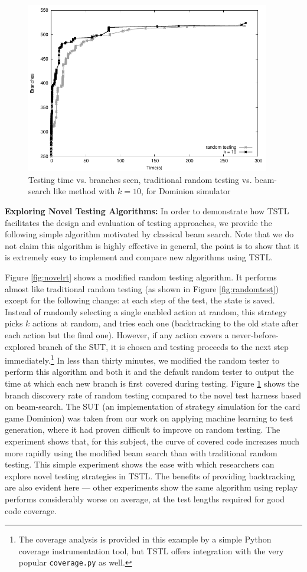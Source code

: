 \documentclass[runningheads,a4paper]{llncs}
\begin{document}
\begin{figure}
\includegraphics[width=4.2in]{explore}
\caption{Testing time vs. branches seen, traditional random testing vs. beam-search like method with $k=10$, for Dominion simulator}
\label{fig:explore}
\end{figure}

{\bf Exploring Novel Testing Algorithms:} In order to demonstrate how
TSTL facilitates the design and evaluation of testing approaches, we
provide the following simple algorithm motivated by classical beam
search.  Note that we do not claim this algorithm is highly effective
in general, the point is to show that it is extremely easy to
implement and compare new algorithms using TSTL.

Figure \ref{fig:novelrt} shows a modified random testing algorithm.
It performs almost like traditional random testing (as shown in Figure
\ref{fig:randomtest}) except for the following change: at each step of
the test, the state is saved.  Instead of randomly selecting a single
enabled action at random, this strategy picks $k$ actions at random,
and tries each one (backtracking to the old state after each action
but the final one).  However, if any action covers a
never-before-explored branch of the SUT, it is chosen and testing
proceeds to the next step immediately.\footnote{The coverage analysis
is provided in this example by a simple Python coverage
instrumentation tool, but TSTL offers integration with the very
popular {\tt coverage.py} as well.}  In less than thirty minutes, we
modified the random tester to perform this algorithm and both it and
the default random tester to output the time at which each new branch
is first covered during testing.  Figure \ref{fig:explore} shows the
branch discovery rate of random testing compared to the novel test
harness based on beam-search.  The SUT (an implementation of strategy
simulation for the card game Dominion) was taken from our work on
applying machine learning to test generation, where it had proven
difficult to improve on random testing.  The experiment shows that,
for this subject, the curve of covered code increases much more
rapidly using the modified beam search than with traditional random
testing.  This simple experiment shows the ease with which researchers
can explore novel testing strategies in TSTL.  The benefits of
providing backtracking are also evident here --- other experiments
show the same algorithm using replay performs considerably worse on
average, at the test lengths required for good code coverage.
\end{document}
